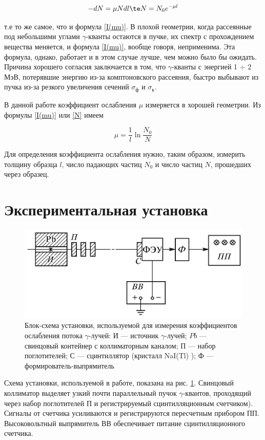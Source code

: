 \documentclass[12pt]{kiarticle}
\newcommand{\ga}{\ensuremath{\gamma}}
\begin{document}
	\begin{equation}\label{N}
	-dN = \mu N dl \te N = N_0 e^{-\mu l}
	\end{equation}
	
	т.е то же самое, что и формула \eqref{I(mu)}. В плохой геометрии, когда рассеянные под небольшими углами
	\ga-кванты остаются в пучке, их спектр с прохождением вещества меняется, и формула \eqref{I(mu)}, вообще говоря, неприменима. Эта формула, однако, работает и в этом случае лучше, чем можно было бы ожидать. Причина хорошего согласия заключается в том, что \ga-кванты с энергией 1 $ \div $ 2 МэВ, потерявшие энергию из-за комптоновского рассеяния,
	быстро выбывают из пучка из-за резкого увеличения сечений $ \sigma_ф $ и $ \sigma_к $.
	
	В данной работе коэффициент ослабления $ \mu $ измеряется в хорошей
	геометрии. Из формулы \eqref{I(mu)} или \eqref{N} имеем
	
	\begin{equation}\label{mu}
	\mu = \dfrac{1}{l} \ln{\dfrac{N_0}{N}}
	\end{equation}
	
	Для определения коэффициента ослабления нужно, таким образом, измерить толщину образца $ l $, число падающих частиц $ N_0 $ и число
	частиц $ N $, прошедших через образец.
	
	\section{Экспериментальная установка}
	
		\begin{figure}[h!]
		\centering
		\includegraphics[width=0.7\linewidth]{lab}
		\caption{Блок-схема установки, используемой для измерения коэффициентов ослабления потока \ga-лучей: И --- источник \ga-лучей; $ Pb $ --- свинцовый контейнер с коллиматорным каналом; П --- набор поглотителей; С --- сцинтиллятор (кристалл
			NaI(Tl) ); Ф --- формирователь-выпрямитель}
		\label{ris lab}
	\end{figure}

Схема установки, используемой в работе, показана на рис. \ref{ris lab}. Свинцовый коллиматор выделяет узкий почти параллельный пучок \ga-квантов, проходящий через набор поглотителей П и регистрируемый сцинтилляционным счетчиком). Сигналы от счетчика усиливаются и регистрируются пересчетным прибором ПП. Высоковольтный выпрямитель ВВ обеспечивает питание сцинтилляционного счетчика.
\end{document}
